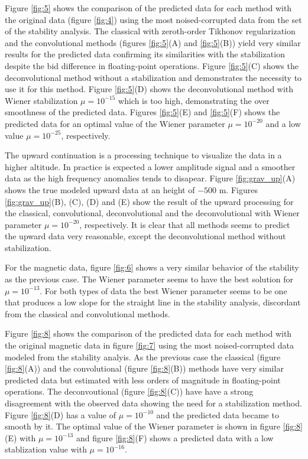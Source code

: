 Figure \ref{fig:5} shows the comparison of the predicted data for each method with the original data (figure \ref{fig:4}) using the most noised-corrupted data from the set of the stability analysis. The classical with zeroth-order Tikhonov regularization and the convolutional methods (figures \ref{fig:5}(A) and \ref{fig:5}(B)) yield very similar results for the predicted data confirming its similarities with the stabilization despite the bid difference in floating-point operations. Figure \ref{fig:5}(C) shows the deconvolutional method without a stabilization and demonstrates the necessity to use it for this method. Figure \ref{fig:5}(D) shows the deconvolutional method with Wiener stabilization $\mu = 10^{-15}$ which is too high, demonstrating the over smoothness of the predicted data. Figures \ref{fig:5}(E) and \ref{fig:5}(F) shows the predicted data for an optimal value of the Wiener parameter $\mu = 10^{-20}$ and a low value $\mu = 10^{-25}$, respectively.

The upward continuation is a processing technique to visualize the data in a higher altitude. In practice is expected a lower amplitude signal and a smoother data as the high frequency anomalies tends to disapear. Figure  \ref{fig:grav_up}(A) shows the true modeled upward data at an height of $-500$ m. Figures \ref{fig:grav_up}(B), (C), (D) and (E) show the result of the upward processing for the classical, convolutional, deconvolutional and the deconvolutional with Wiener parameter $\mu = 10^{-20}$, respectively. It is clear that all methods seems to predict the upward data very reasonable, except the deconvolutional method without stabilization.

For the magnetic data, figure \ref{fig:6} shows a very similar behavior of the stability as the previous case. The Wiener parameter seems to have the best solution for $\mu = 10^{-13}$. For both types of data the best Wiener parameter seems to be one that produces a low slope for the straight line in the stability analysis, discordant from the classical and convolutional methods. 

Figure \ref{fig:8} shows the comparison of the predicted data for each method with the original magnetic data in figure \ref{fig:7} using the most noised-corrupted data modeled from the stability analyis. As the previous case the classical (figure \ref{fig:8}(A)) and the convolutional (figure \ref{fig:8}(B)) methods have very similar predicted data but estimated with less orders of magnitude in floating-point operations. The deconvoutional (figure \ref{fig:8}(C)) have have a strong disagreement with the observed data showing the need for a stabilization method.
Figure \ref{fig:8}(D) has a value of $\mu = 10^{-10}$ and the predicted data became to smooth by it. The optimal value of the Wiener parameter is shown in figure \ref{fig:8}(E) with $\mu = 10^{-13}$ and figure \ref{fig:8}(F) shows a predicted data with a low stablization value with $\mu = 10^{-16}$.

